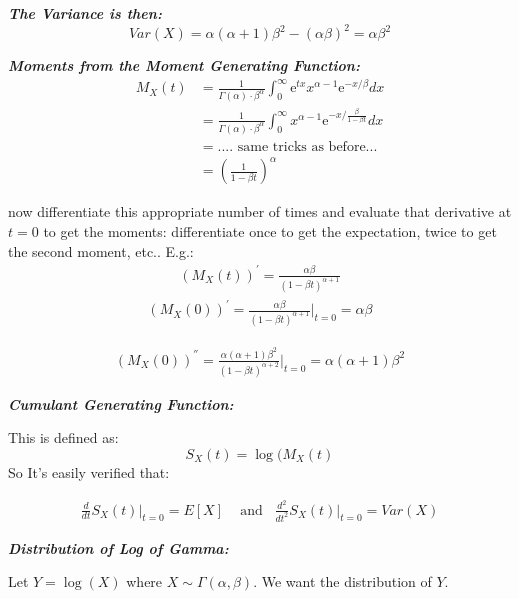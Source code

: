 \documentclass[12pt]{article}
\begin{document}
\textbf{\color{TealBlue}\emph{The Variance is then:} } 
$$
Var(X) = \alpha (\alpha + 1) \beta^2 - (\alpha \beta)^2 = \alpha \beta^2
$$

\textbf{\color{TealBlue}\emph{Moments from the Moment Generating Function:} } 
\begin{align*}
M_X(t) &=  \frac{1}{\Gamma(\alpha) \cdot \beta^{\alpha}} \int_0^{\infty} \mathrm{e}^{tx} x^{\alpha - 1} \mathrm{e}^{-x/\beta} dx\\
&=  \frac{1}{\Gamma(\alpha) \cdot \beta^{\alpha}} \int_0^{\infty}  x^{\alpha - 1} \mathrm{e}^{ - x/ \frac{\beta}{1 - \beta t }} dx \\
&= .... \text{\ \ same tricks as before...}\\
&= \left( \frac{1} { 1 - \beta t } \right)^{\alpha}
\end{align*}

now differentiate this appropriate number of times and evaluate that derivative at $t = 0$ to get the moments: differentiate once to get the expectation, twice to get the second moment, etc.. E.g.:
\begin{align*}
(M_X(t))^{'} = \frac{\alpha \beta} { (1 - \beta t)^{\alpha + 1}}  
\end{align*}
\begin{align*}
(M_X(0))^{'} =  \frac{\alpha \beta} { (1 - \beta t)^{\alpha + 1}}  \Big | _{t=0} = \alpha \beta
\end{align*}

\begin{align*}
(M_X(0))^{''} =  \frac{\alpha (\alpha + 1) \beta^2} { (1 - \beta t)^{\alpha + 2}}  \Big | _{t=0} = \alpha (\alpha + 1)\beta^2
\end{align*}

\begin{center}
\textbf{\color{TealBlue}\emph{Cumulant Generating Function:} } 
\end{center}
This is defined as:
$$
S_X(t) = \log (M_X(t)
$$
So 
It's easily verified that:


\begin{align*}
\frac{d}{dt} S_X(t) \Big|_{t=0} = E[X] \;\;\; \text{ and} \;\;\; \frac{d^2}{dt^2} S_X(t) \Big|_{t=0} = Var(X) 
\end{align*}

\bigskip
\bigskip

\textbf{\color{TealBlue}\emph{Distribution of Log of Gamma:} } 
\bigskip

Let $Y = \log (X)$ where  $X\sim\Gamma(\alpha,\beta)$.  We want the distribution of $Y$. 
\end{document}
